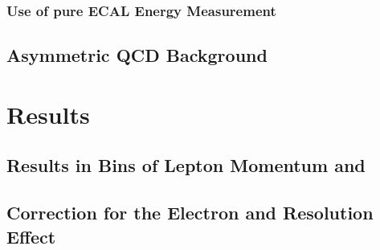 \subsubsection{Use of pure ECAL Energy Measurement}
\subsection{Asymmetric \ac{QCD} Background}

\section{Results}
\subsection{Results in Bins of Lepton Momentum and \ETm}
\subsection{Correction for the Electron and \ETm Resolution Effect}


